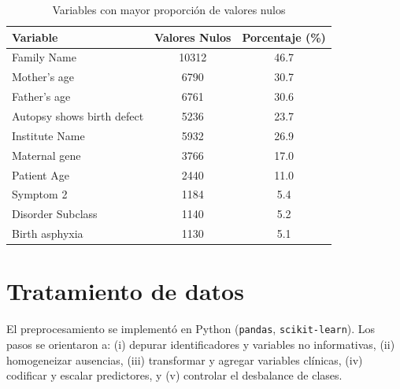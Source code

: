 \documentclass[11pt,a4paper,spanish]{book}
\numberwithin{equation}{chapter}
\numberwithin{figure}{chapter}
\begin{document}
\begin{table}[H]
\centering
\caption{Variables con mayor proporción de valores nulos}
\begin{tabular}{|l|c|c|}
\hline
\textbf{Variable} & \textbf{Valores Nulos} & \textbf{Porcentaje (\%)} \\
\hline
Family Name & 10312 & 46.7 \\
Mother's age & 6790 & 30.7 \\
Father's age & 6761 & 30.6 \\
Autopsy shows birth defect & 5236 & 23.7 \\
Institute Name & 5932 & 26.9 \\
Maternal gene & 3766 & 17.0 \\
Patient Age & 2440 & 11.0 \\
Symptom 2 & 1184 & 5.4 \\
Disorder Subclass & 1140 & 5.2 \\
Birth asphyxia & 1130 & 5.1 \\
\hline
\end{tabular}
\label{tab:nulos}
\end{table}

\section{Tratamiento de datos}

El preprocesamiento se implementó en Python (\texttt{pandas}, \texttt{scikit-learn}). Los pasos se orientaron a: (i) depurar identificadores y variables no informativas, (ii) homogeneizar ausencias, (iii) transformar y agregar variables clínicas, (iv) codificar y escalar predictores, y (v) controlar el desbalance de clases.
\end{document}

